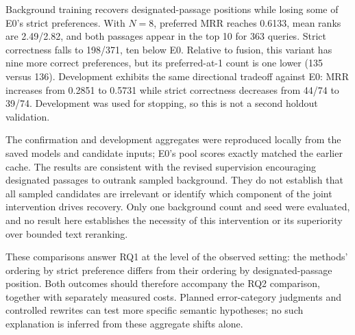 Background training recovers designated-passage positions while losing some of E0's strict preferences. With $N=8$, preferred MRR reaches 0.6133, mean ranks are 2.49/2.82, and both passages appear in the top 10 for 363 queries. Strict correctness falls to 198/371, ten below E0. Relative to fusion, this variant has nine more correct preferences, but its preferred-at-1 count is one lower (135 versus 136). Development exhibits the same directional tradeoff against E0: MRR increases from 0.2851 to 0.5731 while strict correctness decreases from 44/74 to 39/74. Development was used for stopping, so this is not a second holdout validation.

The confirmation and development aggregates were reproduced locally from the saved models and candidate inputs; E0's pool scores exactly matched the earlier cache. The results are consistent with the revised supervision encouraging designated passages to outrank sampled background. They do not establish that all sampled candidates are irrelevant or identify which component of the joint intervention drives recovery. Only one background count and seed were evaluated, and no result here establishes the necessity of this intervention or its superiority over bounded text reranking.

These comparisons answer RQ1 at the level of the observed setting: the methods' ordering by strict preference differs from their ordering by designated-passage position. Both outcomes should therefore accompany the RQ2 comparison, together with separately measured costs. Planned error-category judgments and controlled rewrites can test more specific semantic hypotheses; no such explanation is inferred from these aggregate shifts alone.
